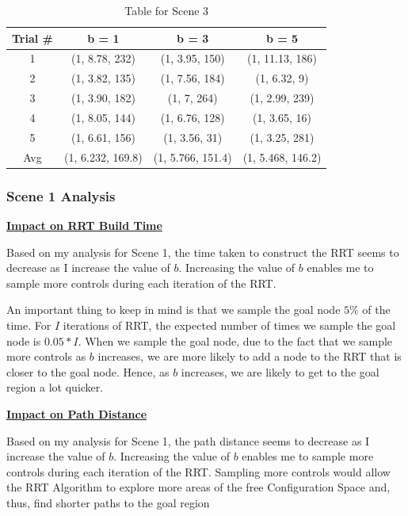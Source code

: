 \documentclass{article}
\begin{document}
\begin{table}[h!]
  \centering
\begin{tabular}{|c|c|c|c|}
  \hline
  Trial \# & b = 1 & b = 3 & b = 5 \\
  \hline
  1 & (1, 8.78, 232) & (1, 3.95, 150) & (1, 11.13, 186) \\
  2 & (1, 3.82, 135) & (1, 7.56, 184) & (1, 6.32, 9) \\
  3 & (1, 3.90, 182) & (1, 7, 264) & (1, 2.99, 239) \\
  4 & (1, 8.05, 144) & (1, 6.76, 128) & (1, 3.65, 16) \\
  5 & (1, 6.61, 156) & (1, 3.56, 31) & (1, 3.25, 281) \\
  Avg & (1, 6.232, 169.8) & (1, 5.766, 151.4) & (1, 5.468, 146.2) \\
  \hline
\end{tabular} 
\caption{Table for Scene 3}
  \label{tab:mytable}
\end{table}

\newpage 
\subsubsection{Scene 1 Analysis}

\textbf{\underline{Impact on RRT Build Time}} \newline

Based on my analysis for Scene 1, the time taken to construct the RRT seems to decrease as I increase the value of $b$. Increasing the value of $b$ enables me to sample more controls during each iteration of the RRT. \newline 

An important thing to keep in mind is that we sample the goal node $5\%$ of the time. For $I$ iterations of RRT, the expected number of times we sample the goal node is $0.05 * I$. When we sample the goal node, due to the fact that we sample more controls as $b$ increases, we are more likely to add a node to the RRT that is closer to the goal node. Hence, as $b$ increases, we are likely to get to the goal region a lot quicker. \newline 


\textbf{\underline{Impact on Path Distance}} \newline

Based on my analysis for Scene 1, the path distance seems to decrease as I increase the value of $b$. Increasing the value of $b$ enables me to sample more controls during each iteration of the RRT. Sampling more controls would allow the RRT Algorithm to explore more areas of the free Configuration Space and, thus, find shorter paths to the goal region \newline 
\end{document}
